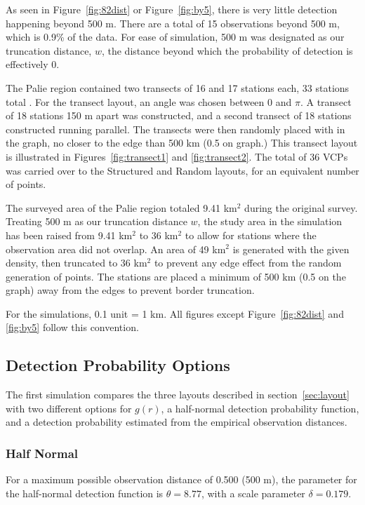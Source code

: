 \documentclass[12pt]{article}
\begin{document}
As seen in Figure~\ref{fig:82dist} or Figure~\ref{fig:by5}, there is very little detection happening beyond 500 m. There are a total of 15 observations beyond 500 m, which is 0.9\% of the data. For ease of simulation, 500 m was designated as our truncation distance, $w$, the distance beyond which the probability of detection is effectively 0.

The Palie region contained two transects of 16 and 17 stations each, 33 stations total \parencite{micronesian}. For the transect layout, an angle was chosen between $0$ and $\pi$. A transect of 18 stations 150 m apart was constructed, and a second transect of 18 stations constructed running parallel. The transects were then randomly placed with in the graph, no closer to the edge than 500 km (0.5 on graph.) This transect layout is illustrated in Figures~\ref{fig:transect1} and \ref{fig:transect2}. The total of 36 VCPs was carried over to the Structured and Random layouts, for an equivalent number of points.

The surveyed area of the Palie region totaled 9.41 km$^2$ during the original survey. Treating 500 m as our truncation distance $w$, the study area in the simulation has been raised from 9.41 km$^2$ to 36 km$^2$ to allow for stations where the observation area did not overlap. An area of 49 km$^2$ is generated with the given density, then truncated to 36 km$^2$ to prevent any edge effect from the random generation of points. The stations are placed a minimum of 500 km (0.5 on the graph) away from the edges to prevent border truncation. 

For the simulations, 0.1 unit = 1 km. All figures except Figure~\ref{fig:82dist} and \ref{fig:by5} follow this convention.

\subsection{Detection Probability Options}
The first simulation compares the three layouts described in section~\ref{sec:layout} with two different options for $g(r)$, a half-normal detection probability function, and a detection probability estimated from the empirical observation distances.
\subsubsection{Half Normal}
For a maximum possible observation distance of 0.500 (500 m), the parameter for the half-normal detection function is $\theta = 8.77$, with a scale parameter $\delta = 0.179$.
\end{document}
